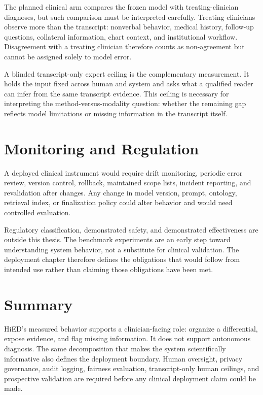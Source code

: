 The planned clinical arm compares the frozen model with treating-clinician diagnoses, but such comparison must be interpreted carefully. Treating clinicians observe more than the transcript: nonverbal behavior, medical history, follow-up questions, collateral information, chart context, and institutional workflow. Disagreement with a treating clinician therefore counts as non-agreement but cannot be assigned solely to model error.

A blinded transcript-only expert ceiling is the complementary measurement. It holds the input fixed across human and system and asks what a qualified reader can infer from the same transcript evidence. This ceiling is necessary for interpreting the method-versus-modality question: whether the remaining gap reflects model limitations or missing information in the transcript itself.

\section{Monitoring and Regulation}

A deployed clinical instrument would require drift monitoring, periodic error review, version control, rollback, maintained scope lists, incident reporting, and revalidation after changes. Any change in model version, prompt, ontology, retrieval index, or finalization policy could alter behavior and would need controlled evaluation.

Regulatory classification, demonstrated safety, and demonstrated effectiveness are outside this thesis. The benchmark experiments are an early step toward understanding system behavior, not a substitute for clinical validation. The deployment chapter therefore defines the obligations that would follow from intended use rather than claiming those obligations have been met.

\section{Summary}

HiED's measured behavior supports a clinician-facing role: organize a differential, expose evidence, and flag missing information. It does not support autonomous diagnosis. The same decomposition that makes the system scientifically informative also defines the deployment boundary. Human oversight, privacy governance, audit logging, fairness evaluation, transcript-only human ceilings, and prospective validation are required before any clinical deployment claim could be made.
